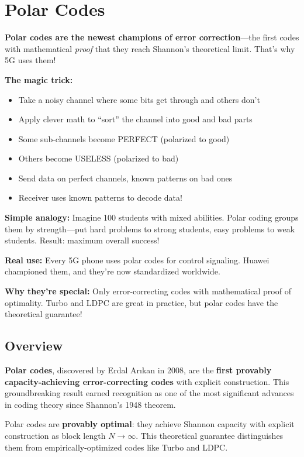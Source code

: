 \chapter{Polar Codes}
\label{ch:polar}

\begin{nontechnical}
\textbf{Polar codes are the newest champions of error correction}---the first codes with mathematical \emph{proof} that they reach Shannon's theoretical limit. That's why 5G uses them!

\textbf{The magic trick:}
\begin{itemize}
\item Take a noisy channel where some bits get through and others don't
\item Apply clever math to ``sort'' the channel into good and bad parts
\item Some sub-channels become PERFECT (polarized to good)
\item Others become USELESS (polarized to bad)
\item Send data on perfect channels, known patterns on bad ones
\item Receiver uses known patterns to decode data!
\end{itemize}

\textbf{Simple analogy:} Imagine 100 students with mixed abilities. Polar coding groups them by strength---put hard problems to strong students, easy problems to weak students. Result: maximum overall success!

\textbf{Real use:} Every 5G phone uses polar codes for control signaling. Huawei championed them, and they're now standardized worldwide.

\textbf{Why they're special:} Only error-correcting codes with mathematical proof of optimality. Turbo and LDPC are great in practice, but polar codes have the theoretical guarantee!
\end{nontechnical}

\section{Overview}

\textbf{Polar codes}, discovered by Erdal Ar{\i}kan in 2008, are the \textbf{first provably capacity-achieving error-correcting codes} with explicit construction. This groundbreaking result earned recognition as one of the most significant advances in coding theory since Shannon's 1948 theorem.

\begin{keyconcept}
Polar codes are \textbf{provably optimal}: they achieve Shannon capacity with explicit construction as block length $N \to \infty$. This theoretical guarantee distinguishes them from empirically-optimized codes like Turbo and LDPC.
\end{keyconcept}

